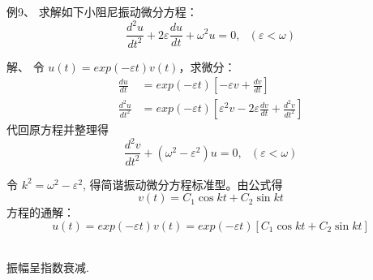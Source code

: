 \begin{frame}
	\begin{exampleblock} {例9、	求解如下小阻尼振动微分方程：}
	\begin{equation*}
		\frac{d^2 u}{d t^2} +2\varepsilon \frac{d u}{dt} +\omega ^2 u = 0 ,  ~~~ (\varepsilon < \omega)   
	\end{equation*}
	\end{exampleblock} 
	\alert{解、} 令 $\displaystyle  u(t)= exp(-\varepsilon t) v(t) $，求微分：	
	\begin{align*}
		\frac{d u}{d t } & =exp(-\varepsilon t) [-\varepsilon v +\frac{d v}{dt}]\\
		\frac{d^2 u}{d t^2 } & =exp(-\varepsilon t) [\varepsilon ^2 v -2\varepsilon \frac{d v}{dt}+ \frac{d^2 v}{dt^2} ]
	\end{align*}
	代回原方程并整理得
	\begin{equation*}
		\frac{d^2 v}{d t^2} +(\omega ^2 - \varepsilon ^2) u = 0,  ~~~ (\varepsilon < \omega)   
	\end{equation*}
\end{frame}

\begin{frame}	
	令 $k^2 =\omega ^2 - \varepsilon ^2 $, 得简谐振动微分方程标准型。由公式得
	\begin{equation*}
		v(t)=C_1 \cos k t +C_2 \sin k t 
	\end{equation*}
	方程的通解： 
	\begin{equation*}
		u(t)= exp(-\varepsilon t) v(t) =exp(-\varepsilon t) [ C_1 \cos k t +C_2 \sin k t] 
	\end{equation*}	
\end{frame}

\begin{frame}	
	\\
	振幅呈指数衰减.
\end{frame}

